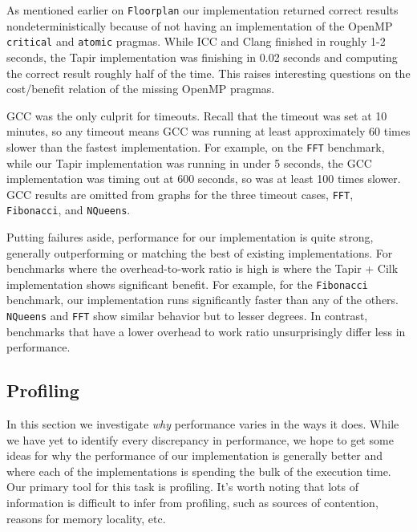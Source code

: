 \documentclass[sigconf]{acmart}
\begin{document}
As mentioned earlier on \texttt{Floorplan} our implementation returned correct
results nondeterministically because of not having an implementation of the OpenMP
\texttt{critical} and \texttt{atomic} pragmas. While ICC and Clang finished in
roughly 1-2 seconds, the Tapir implementation was finishing in 0.02 seconds
and computing the correct result roughly half of the time. This raises interesting
questions on the cost/benefit relation of the missing OpenMP pragmas.

GCC was the only culprit for timeouts. Recall that the timeout was set at 10
minutes, so any timeout means GCC was running at least approximately 60 times
slower than the fastest implementation. For example, on the \texttt{FFT}
benchmark, while our Tapir implementation was running in under 5 seconds, the
GCC implementation was timing out at 600 seconds, so was at least 100 times
slower. GCC results are omitted from graphs for the three timeout cases,
\texttt{FFT}, \texttt{Fibonacci}, and \texttt{NQueens}.

Putting failures aside, performance for our implementation is quite strong,
generally outperforming or matching the best of existing implementations. For
benchmarks where the overhead-to-work ratio is high is where the Tapir + Cilk
implementation shows significant benefit. For example, for the
\texttt{Fibonacci} benchmark, our implementation runs significantly faster than
any of the others. \texttt{NQueens} and \texttt{FFT} show similar behavior but
to lesser degrees. In contrast, benchmarks that have a lower overhead to work
ratio unsurprisingly differ less in performance. 

\subsection{Profiling}

In this section we investigate \emph{why} performance varies in the ways it
does. While we have yet to identify every discrepancy in performance, we hope
to get some ideas for why the performance of our implementation is generally
better and where each of the implementations is spending the bulk of the
execution time. Our primary tool for this task is profiling. It's worth noting
that lots of information is difficult to infer from profiling, such as sources
of contention, reasons for memory locality, etc.
\end{document}
